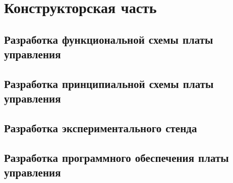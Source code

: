 \newpage
\section{Конструкторская часть}

\newpage
\subsection{Разработка функциональной схемы платы управления}

\newpage
\subsection{Разработка принципиальной схемы платы управления}

\newpage
\subsection{Разработка экспериментального стенда}


\newpage
\subsection{Разработка программного обеспечения платы управления}

